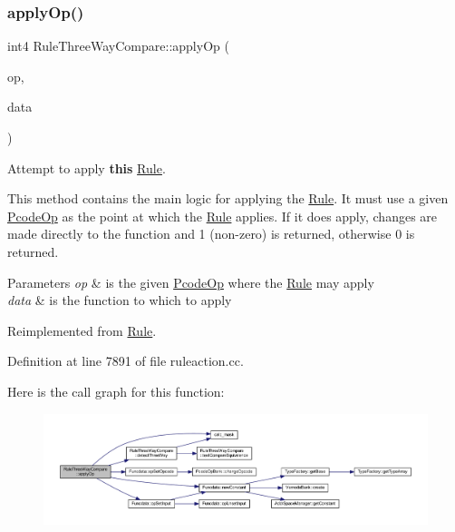 \subsubsection{\texorpdfstring{applyOp()}{applyOp()}}
{\footnotesize\ttfamily int4 Rule\+Three\+Way\+Compare\+::apply\+Op (\begin{DoxyParamCaption}\item[{\mbox{\hyperlink{class_pcode_op}{Pcode\+Op}} $\ast$}]{op,  }\item[{\mbox{\hyperlink{class_funcdata}{Funcdata}} \&}]{data }\end{DoxyParamCaption})\hspace{0.3cm}{\ttfamily [virtual]}}



Attempt to apply {\bfseries{this}} \mbox{\hyperlink{class_rule}{Rule}}. 

This method contains the main logic for applying the \mbox{\hyperlink{class_rule}{Rule}}. It must use a given \mbox{\hyperlink{class_pcode_op}{Pcode\+Op}} as the point at which the \mbox{\hyperlink{class_rule}{Rule}} applies. If it does apply, changes are made directly to the function and 1 (non-\/zero) is returned, otherwise 0 is returned. 
\begin{DoxyParams}{Parameters}
{\em op} & is the given \mbox{\hyperlink{class_pcode_op}{Pcode\+Op}} where the \mbox{\hyperlink{class_rule}{Rule}} may apply \\
\hline
{\em data} & is the function to which to apply \\
\hline
\end{DoxyParams}


Reimplemented from \mbox{\hyperlink{class_rule_a4e3e61f066670175009f60fb9dc60848}{Rule}}.



Definition at line 7891 of file ruleaction.\+cc.

Here is the call graph for this function\+:
\nopagebreak
\begin{figure}[H]
\begin{center}
\leavevmode
\includegraphics[width=350pt]{class_rule_three_way_compare_af661958d83d132fd75bf054671649a27_cgraph}
\end{center}
\end{figure}
\mbox{\label{class_rule_three_way_compare_a09b29d9c26493081ff283fa11e845f52}} 
